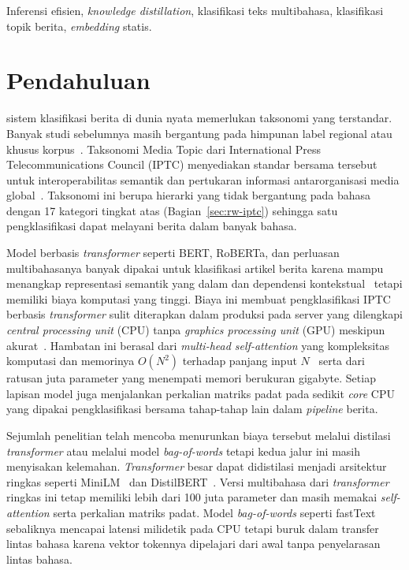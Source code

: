 \documentclass{ieeeaccess}
\newcommand{\en}[1]{\textit{#1}}
\begin{document}
\begin{keywords}
Inferensi efisien, \en{knowledge distillation}, klasifikasi teks multibahasa, klasifikasi topik berita, \en{embedding} statis.
\end{keywords}

\titlepgskip=-21pt

\maketitle

\section{Pendahuluan}
\label{sec:introduction}
 sistem klasifikasi berita di dunia nyata memerlukan taksonomi yang terstandar. Banyak studi sebelumnya masih bergantung pada himpunan label regional atau khusus korpus~\cite{razuvayevskaya2024peft,adelani2023masakhanews,mirashi2023indicnews}. Taksonomi Media Topic dari International Press Telecommunications Council (IPTC) menyediakan standar bersama tersebut untuk interoperabilitas semantik dan pertukaran informasi antarorganisasi media global~\cite{iptc2024mediatopics}. Taksonomi ini berupa hierarki yang tidak bergantung pada bahasa dengan 17 kategori tingkat atas (Bagian~\ref{sec:rw-iptc}) sehingga satu pengklasifikasi dapat melayani berita dalam banyak bahasa.

Model berbasis \en{transformer} seperti BERT, RoBERTa, dan perluasan multibahasanya banyak dipakai untuk klasifikasi artikel berita karena mampu menangkap representasi semantik yang dalam dan dependensi kontekstual~\cite{razuvayevskaya2024peft,sebok2025babelmachine,kuzman2025llm} tetapi memiliki biaya komputasi yang tinggi. Biaya ini membuat pengklasifikasi IPTC berbasis \en{transformer} sulit diterapkan dalam produksi pada server yang dilengkapi \en{central processing unit} (CPU) tanpa \en{graphics processing unit} (GPU) meskipun akurat~\cite{zschache2026energy,treviso2023efficient}. Hambatan ini berasal dari \en{multi-head self-attention} yang kompleksitas komputasi dan memorinya $O(N^2)$ terhadap panjang input $N$~\cite{minaee2022dltextclf} serta dari ratusan juta parameter yang menempati memori berukuran gigabyte. Setiap lapisan model juga menjalankan perkalian matriks padat pada sedikit \en{core} CPU yang dipakai pengklasifikasi bersama tahap-tahap lain dalam \en{pipeline} berita.

Sejumlah penelitian telah mencoba menurunkan biaya tersebut melalui distilasi \en{transformer} atau melalui model \en{bag-of-words} tetapi kedua jalur ini masih menyisakan kelemahan. \en{Transformer} besar dapat didistilasi menjadi arsitektur ringkas seperti MiniLM~\cite{wang2021minilmv2} dan DistilBERT~\cite{sanh2019distilbert}. Versi multibahasa dari \en{transformer} ringkas ini tetap memiliki lebih dari 100 juta parameter dan masih memakai \en{self-attention} serta perkalian matriks padat. Model \en{bag-of-words} seperti fastText~\cite{joulin2017bag} sebaliknya mencapai latensi milidetik pada CPU tetapi buruk dalam transfer lintas bahasa karena vektor tokennya dipelajari dari awal tanpa penyelarasan lintas bahasa.
\end{document}
